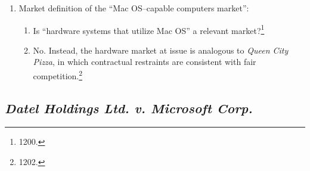 \begin{enumerate}
\begin{enumerate}
        competition.\footnote{1198--1200.}
        \item \textbf{``~.~.~.~the counterclaim does not plausibly allege that 
        Mac OS is an independent market.''}\footnote{1200.}
    \end{enumerate}
    \item Market definition of the ``Mac OS--capable computers market'':
    \begin{enumerate}
        \item Is ``hardware systems that utilize Mac OS'' a relevant 
        market?\footnote{1200.}
        \item No. Instead, the hardware market at issue is analogous to 
        \emph{Queen City Pizza}, in which contractual restraints are 
        consistent with fair competition.\footnote{1202.}
    \end{enumerate}
\end{enumerate}

\subsection{\emph{Datel Holdings Ltd. v. Microsoft Corp.}}


